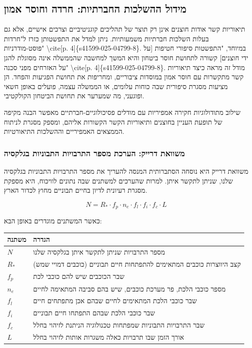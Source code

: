 \documentclass[12pt,a4paper]{article}
\begin{document}
\subsection{מידול ההשלכות החברתיות: חרדה וחוסר אמון}
תיאוריות קשר אודות חוצנים אינן רק תוצר של תהליכים קוגניטיביים וצרכים אישיים, אלא גם בעלות השלכות חברתיות משמעותיות. ניתן למדל את התפשטותן כזרז ל"חרדות פוסט-מודרניות" \textbackslash{}cite[p. 4]\{s41599-025-04799-8\}. במיוחד, "התפשטות סיפורי חטיפות [על ידי חוצנים] קשורה לתחושת חוסר ביטחון והיא המשך למחשבה שהממשלה אינה מסוגלת להגן על האזרחים מפני סכנה" \textbackslash{}cite[p. 4]\{s41599-025-04799-8\}. מודל זה מראה כיצד תיאוריות קשר מתקשרות עם חוסר אמון במוסדות ציבוריים, ומחריפות את תחושת הפגיעות והפחד. הן מציעות מסגרת סיפורית שבה כוחות עלומים, או הממשלה עצמה, פועלים באופן חשאי ופוגעני, מה שמערער את תחושת הביטחון הקולקטיבי.

שילוב מתודולוגיות חקירה אמפיריות עם מודלים פסיכולוגיים-חברתיים מאפשר הבנה מקיפה של תופעת העניין בחוצנים ותיאוריות הקשר הקשורות אליהם, ומספק מסגרת לניתוח הממצאים האמפיריים וההשלכות התיאורטיות.

\subsubsection*{משוואת דרייק: הערכת מספר התרבויות התבוניות בגלקסיה}
משוואת דרייק היא נוסחה הסתברותית המנסה להעריך את מספר התרבויות התבוניות בגלקסיה שלנו, שניתן לתקשר איתן. למרות שהערכים למשתנים שבה נתונים לוויכוח, היא מספקת מסגרת רעיונית לדיון בחיים תבוניים מחוץ לכדור הארץ.

\begin{equation}
N = R_* \cdot f_p \cdot n_e \cdot f_l \cdot f_i \cdot f_c \cdot L
\end{equation}

כאשר המשתנים מוגדרים באופן הבא:
\begin{center}
\begin{tabular}{|l l|}
\hline
\textbf{משתנה} & \textbf{הגדרה} \\
\hline
$N$ & מספר התרבויות שניתן לתקשר איתן בגלקסיה שלנו \\
$R_*$ & קצב היווצרות כוכבים המתאימים להתפתחות חיים תבוניים (כוכבים דמויי שמש) \\
$f_p$ & שבר הכוכבים שיש להם כוכבי לכת \\
$n_e$ & מספר כוכבי הלכת, פר מערכת כוכבים, שיש בהם סביבה המתאימה לחיים \\
$f_l$ & שבר כוכבי הלכת המתאימים לחיים שבהם אכן מתפתחים חיים \\
$f_i$ & שבר כוכבי הלכת שבהם התפתחו חיים תבוניים \\
$f_c$ & שבר התרבויות התבוניות שמפתחות טכנולוגיה הניתנת לזיהוי בחלל \\
$L$ & אורך הזמן שבו תרבויות כאלה משגרות אותות לזיהוי בחלל \\
\hline
\end{tabular}
\end{center}
\end{document}
